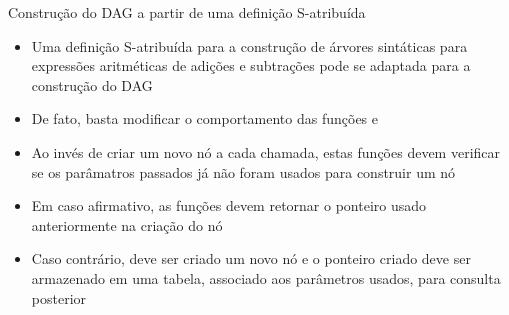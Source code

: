 \begin{frame}[fragile]{Construção do DAG a partir de uma definição S-atribuída}

    \begin{itemize}
        \item Uma definição S-atribuída para a construção de árvores sintáticas para expressões aritméticas de adições e subtrações pode se adaptada para a 
            construção do DAG
        \pause

        \item De fato, basta modificar o comportamento das funções  e 
        \pause

        \item Ao invés de criar um novo nó a cada chamada, estas funções devem verificar se os parâmatros passados já não foram usados para construir um nó
        \pause

        \item Em caso afirmativo, as funções devem retornar o ponteiro usado anteriormente na criação do nó
        \pause

        \item Caso contrário, deve ser criado um novo nó e o ponteiro criado deve ser armazenado em uma tabela, associado aos parâmetros usados, para consulta
            posterior
    \end{itemize}

\end{frame}


